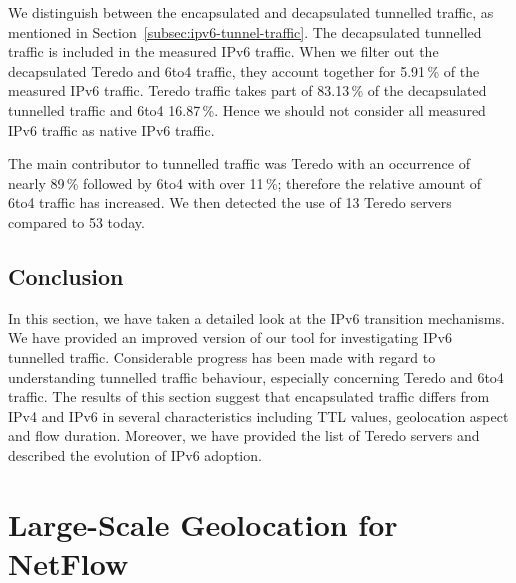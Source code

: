 We distinguish between the encapsulated and decapsulated tunnelled traffic, as mentioned in Section~\ref{subsec:ipv6-tunnel-traffic}. The decapsulated tunnelled traffic is included in the measured IPv6 traffic. When we filter out the decapsulated Teredo and 6to4 traffic, they account together for 5.91\,\% of the measured IPv6 traffic. Teredo traffic takes part of 83.13\,\% of the decapsulated tunnelled traffic and 6to4 16.87\,\%. Hence we should not consider all measured IPv6 traffic as native IPv6 traffic.

The main contributor to tunnelled traffic was Teredo with an occurrence of nearly 89\,\% followed by 6to4 with over 11\,\%; therefore the relative amount of 6to4 traffic has increased. We then detected the use of 13 Teredo servers compared to 53 today. %

\subsection{Conclusion} \label{subsec:ipv6-tunnels-conclusion}

In this section, we have taken a detailed look at the IPv6 transition mechanisms. We have provided an improved version of our tool for investigating IPv6 tunnelled traffic. Considerable progress has been made with regard to understanding tunnelled traffic behaviour, especially concerning Teredo and 6to4 traffic. The results of this section suggest that encapsulated traffic differs from IPv4 and IPv6 in several characteristics including TTL values, geolocation aspect and flow duration. Moreover, we have provided the list of Teredo servers and described the evolution of IPv6 adoption.



\section{Large-Scale Geolocation for NetFlow}\label{sec:analysis-geolocation}

